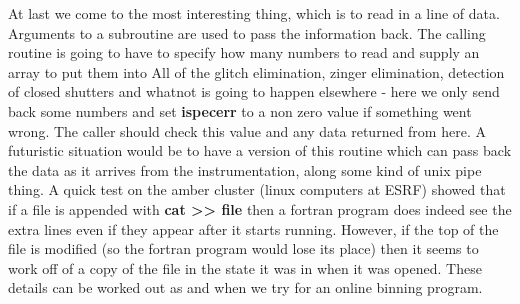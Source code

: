 \documentclass[10pt,a4paper,notitlepage]{article}
\newcommand{\var}[1]{\textbf{\textsf{#1}}} %
\newcommand{\code}[1]{\textbf{\textsf{#1}}} %
\begin{document}
At last we come to the most interesting thing, which is to read in a line of 
data. 
Arguments to a subroutine are used to pass the information back.
The calling routine is going to have to specify how many numbers to read and
supply an array to put them into
All of the glitch elimination, zinger elimination, detection of closed 
shutters and whatnot is going to happen elsewhere - here we only send back 
some numbers and set \var{ispecerr} to a non zero value if something went 
wrong. 
The caller should check this value and any data returned from here.
A futuristic situation would be to have a version of this routine
which can pass back the data as it arrives from the instrumentation, along 
some kind of unix pipe thing.
A quick test on the amber cluster (linux computers at ESRF) showed that
if a file is appended with \code{cat >> file} then a fortran program does 
indeed see the extra lines even if they appear after it starts running. 
However, if the top of the file is modified (so the fortran program would lose
its place) then it seems to work off of a copy of the file in the state
it was in when it was opened. These details can be worked out as and when
we try for an online binning program.
\end{document}
